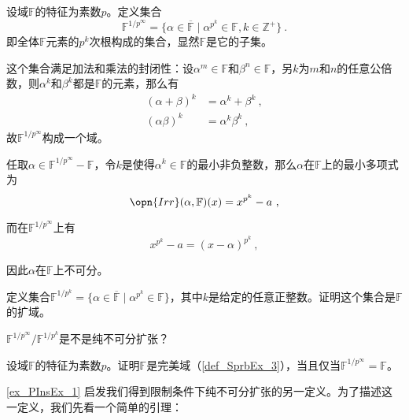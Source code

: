 \begin{example}{}\label{ex_PInsEx_1}
设域$\mathbb{F}$的特征为素数$p$。定义集合
\begin{equation}
\mathbb{F}^{1/p^\infty} = \{\alpha\in\overline{\mathbb{F}}\mid \alpha^{p^k}\in\mathbb{F}, k\in\mathbb{Z}^+\}~.
\end{equation}
即全体$\mathbb{F}$元素的$p^k$次根构成的集合，显然$\mathbb{F}$是它的子集。

这个集合满足加法和乘法的封闭性：设$\alpha^m\in\mathbb{F}$和$\beta^n\in\mathbb{F}$，另$k$为$m$和$n$的任意公倍数，则$\alpha^k$和$\beta^k$都是$\mathbb{F}$的元素，那么有
\begin{equation}
\begin{aligned}
(\alpha+\beta)^k&=\alpha^k+\beta^k~,\\
(\alpha\beta)^k&=\alpha^k\beta^k~,
\end{aligned}
\end{equation}
故$\mathbb{F}^{1/p^\infty}$构成一个域。

任取$\alpha\in\mathbb{F}^{1/p^\infty}-\mathbb{F}$，令$k$是使得$\alpha^k\in\mathbb{F}$的最小非负整数，那么$\alpha$在$\mathbb{F}$上的最小多项式为
\begin{equation}
\opn{Irr}(\alpha, \mathbb{F})(x) = x^{p^k}-a~,
\end{equation}

而在$\mathbb{F}^{1/p^\infty}$上有
\begin{equation}
x^{p^k}-a = (x-\alpha)^{p^k}~,
\end{equation}

因此$\alpha$在$\mathbb{F}$上不可分。

\end{example}



\begin{exercise}{}
定义集合$\mathbb{F}^{1/p^k}=\{\alpha\in\overline{\mathbb{F}}\mid \alpha^{p^k}\in\mathbb{F}\}$，其中$k$是给定的任意正整数。证明这个集合是$\mathbb{F}$的扩域。

$\mathbb{F}^{1/p^\infty}/\mathbb{F}^{1/p^k}$是不是纯不可分扩张？
\end{exercise}


\begin{exercise}{}
设域$\mathbb{F}$的特征为素数$p$。证明$\mathbb{F}$是完美域（\autoref{def_SprbEx_3}），当且仅当$\mathbb{F}^{1/p^\infty}=\mathbb{F}$。
\end{exercise}



\autoref{ex_PInsEx_1} 启发我们得到限制条件下纯不可分扩张的另一定义。为了描述这一定义，我们先看一个简单的引理：

